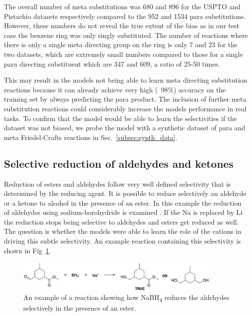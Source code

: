 The overall number of meta substitutions was 680 and 896 for the USPTO and Pistachio datasets respectively compared to the 952 and 1534 para substitutions. However, these numbers do not reveal the true extent of the bias as in our test case the benzene ring was only singly substituted. The number of reactions where there is only a single meta directing group on the ring is only 7 and 23 for the two datasets, which are extremely small numbers compared to those for a single para directing substituent which are 347 and 609, a ratio of 25-50 times.

This may result in the models not being able to learn meta directing substitution reactions because it can already achieve very high (~98\%) accuracy on the training set by always predicting the para product. The inclusion of further meta substitution reactions could considerably increase the models performance in real tasks. To confirm that the model would be able to learn the selectivities if the dataset was not biased, we probe the model with a synthetic dataset of para and meta Friedel-Crafts reactions in Sec.~\ref{subsec:synth_data}.

\subsection{Selective reduction of aldehydes and ketones}
Reduction of esters and aldehydes follow very well defined selectivity that is determined by the reducing agent. It is possible to reduce selectively an aldehyde or a ketone to alcohol in the presence of an ester. In this example the reduction of aldehydes using sodium-borohydride is examined \cite{Clayden2012}. If the Na is replaced by Li the reduction stops being selective to aldehydes and esters get reduced as well. The question is whether the models were able to learn the role of the cations in driving this subtle selectivity. An example reaction containing this selectivity is shown in Fig~\ref{fig:redu}.

\begin{figure}[htbp!] 
\centering    
\includegraphics[width=0.9\textwidth]{Chapters/Ch4/Figs/reduction.png}
\caption{An example of a reaction showing how NaBH\textsubscript{4} reduces the aldehydes selectively in the presence of an ester.}
\label{fig:redu}
\end{figure}

